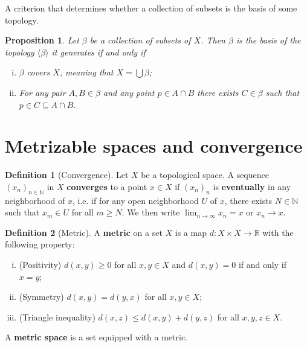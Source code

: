 \documentclass[a4paper,12pt,parskip=half*,chapterprefix=true,numbers=noendperiod]{scrreprt}
\newtheorem{proposition}{Proposition}[section]
\theoremstyle{definition}
\newtheorem{definition}{Definition}[section]
\theoremstyle{remark}
\begin{document}
A criterion that determines whether a collection of subsets is the basis of some topology.
\begin{proposition}
	Let $\beta$ be a collection of subsets of $X$. Then $\beta$ is the basis of the topology $\langle\beta\rangle$ it generates if and only if
	\begin{enumerate}[(i)]
		\item $\beta$ covers $X$, meaning that $X=\bigcup\beta$;
		\item For any pair $A,B\in\beta$ and any point $p\in A\cap B$ there exists $C\in\beta$ such that $p\in C\subseteq A\cap B$.
	\end{enumerate}
\end{proposition}

\section{Metrizable spaces and convergence}

\begin{definition}[Convergence]
	Let $X$ be a topological space. A sequence $(x_n)_{n\in\mathbb{N}}$ in $X$ \textbf{converges} to a point $x\in X$ if $(x_n)_n$ is \textbf{eventually} in any neighborhood of $x$, i.e. if for any open neighborhood $U$ of $x$, there exists $N\in\mathbb{N}$ such that $x_m\in U$ for all $m\geq N$. We then write $\lim_{n\to\infty}x_n=x$ or $x_n\to x$.
\end{definition}

\begin{definition}[Metric]
	A \textbf{metric} on a set $X$ is a map $d:X\times X\to\mathbb{R}$ with the following property:
	\begin{enumerate}[(i)]
		\item (Positivity) $d(x,y)\geq 0$ for all $x,y\in X$ and $d(x,y)=0$ if and only if $x=y$;
		\item (Symmetry) $d(x,y)=d(y,x)$ for all $x,y\in X$;
		\item (Triangle inequality) $d(x,z)\leq d(x,y)+d(y,z)$ for all $x,y,z\in X$.
	\end{enumerate}
	A \textbf{metric space} is a set equipped with a metric.
\end{definition}
\end{document}
